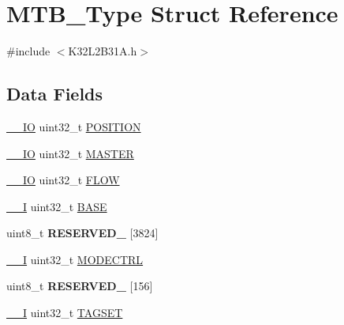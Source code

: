\hypertarget{struct_m_t_b___type}{}\section{M\+T\+B\+\_\+\+Type Struct Reference}
\label{struct_m_t_b___type}


{\ttfamily \#include $<$K32\+L2\+B31\+A.\+h$>$}

\subsection*{Data Fields}
\begin{DoxyCompactItemize}
\item 
\mbox{\hyperlink{core__cm0plus_8h_aec43007d9998a0a0e01faede4133d6be}{\+\_\+\+\_\+\+IO}} uint32\+\_\+t \mbox{\hyperlink{struct_m_t_b___type_aacfec5feeacac6c5b12fd2eef4fcd197}{P\+O\+S\+I\+T\+I\+ON}}
\item 
\mbox{\hyperlink{core__cm0plus_8h_aec43007d9998a0a0e01faede4133d6be}{\+\_\+\+\_\+\+IO}} uint32\+\_\+t \mbox{\hyperlink{struct_m_t_b___type_acc1a632d91e654ed519f8a5baa954733}{M\+A\+S\+T\+ER}}
\item 
\mbox{\hyperlink{core__cm0plus_8h_aec43007d9998a0a0e01faede4133d6be}{\+\_\+\+\_\+\+IO}} uint32\+\_\+t \mbox{\hyperlink{struct_m_t_b___type_ae7fbeaa986ae874c8c93bb71ba6ced25}{F\+L\+OW}}
\item 
\mbox{\hyperlink{core__cm0plus_8h_af63697ed9952cc71e1225efe205f6cd3}{\+\_\+\+\_\+I}} uint32\+\_\+t \mbox{\hyperlink{struct_m_t_b___type_a890f44fa11afe8e8452a179312dbbfd6}{B\+A\+SE}}
\item 
\mbox{\label{struct_m_t_b___type_a6ec763bccac6d03f5d21615e8190a0cf}} 
uint8\+\_\+t {\bfseries R\+E\+S\+E\+R\+V\+E\+D\+\_} \mbox{[}3824\mbox{]}
\item 
\mbox{\hyperlink{core__cm0plus_8h_af63697ed9952cc71e1225efe205f6cd3}{\+\_\+\+\_\+I}} uint32\+\_\+t \mbox{\hyperlink{struct_m_t_b___type_a22ddc096f121ce961c24976be80cacba}{M\+O\+D\+E\+C\+T\+RL}}
\item 
\mbox{\label{struct_m_t_b___type_a280910d9fdfd8acf24edab1d3950c732}} 
uint8\+\_\+t {\bfseries R\+E\+S\+E\+R\+V\+E\+D\+\_} \mbox{[}156\mbox{]}
\item 
\mbox{\hyperlink{core__cm0plus_8h_af63697ed9952cc71e1225efe205f6cd3}{\+\_\+\+\_\+I}} uint32\+\_\+t \mbox{\hyperlink{struct_m_t_b___type_a5a64f3efc24eb45f8629ddc8050071d0}{T\+A\+G\+S\+ET}}

\end{DoxyCompactItemize}
